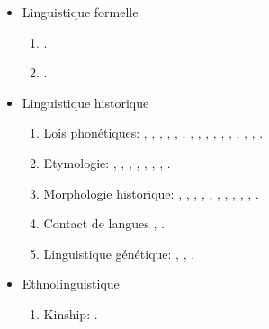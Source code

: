 \documentclass[oldfontcommands,oneside,a4paper,11pt]{article}
\newcommand{\langue}[2]{#2}
\begin{document}
\begin{itemize}
\item \langue{Formal linguistics}{Linguistique formelle}
\begin{enumerate}
\item \citet{walther14inv.canon}.
\item \citet{walther14compactness}.
\end{enumerate}

\item \langue{Historical linguistics}{Linguistique historique}
\begin{enumerate}
\item \langue{Sound laws}{Lois phonétiques}:  \citet{jacques00ywij}, \citet{jacques01dg}, \citet{jacques03dissimilation},   \citet{jacques04thimphu}, \citet{jacques06comparaison}, \citet{jacques09wazur}, \citet{jacques09e}, \citet{michaud10bonin}, \citet{jacques10ndr}, \citet{jacques.michaud11naish},   \citet{rg-gj12yod}, \citet{jacques13arapaho}, \citet{jacques13yod}, \citet{jacques14snom},   \citet{jacques14esquisse}, \citet{jacques14cone}.
\item  \langue{Etymology}{Etymologie}:    \citet{jacques07naksatram}, \citet{jacques08debther}, \citet{jacques09zz}, \citet{jacques10imperial}, \citet{jacques11ngwemi}, \citet{jacques12bear},  \citet{jacques13vama},   \citet{jacques14esquisse}.
\item \langue{Historical morphology}{Morphologie historique}:  \citet{jacques03s.houzhui}, \citet{jacques06morpho}, \citet{jacques07chang},    \citet{jacques09tangutverb}, \citet{jacques10zos}, \citet{jacques11tangut.verb}, \citet{jacques12agreement}, \citet{jacques12internal}, \citet{jacques14antipassive},   \citet{jacques14esquisse}, \citet{jacques14cone}.
\item \langue{Language contact:}{Contact de langues} \citet{antonov12kumush},   \citet{jacques12bear}.
\item \langue{Genetic linguistics}{Linguistique génétique}:  \citet{jacques07chang}, \citet{jacques12agreement}, \citet{jacques2015genetic}.
\end{enumerate}
\item \langue{Ethnolinguistics}{Ethnolinguistique}
\begin{enumerate}
\item Kinship: \citet{jacques11kinship}. 

\end{enumerate}
  
  
\end{itemize}




\end{document}
